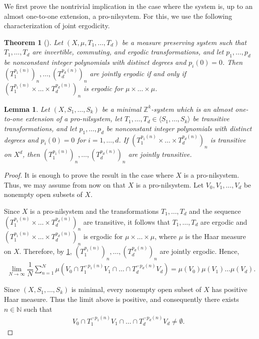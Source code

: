 \documentclass[11pt,reqno]{amsart}
\newcommand{\Z}{\mathbb{Z}}
\newcommand{\N}{\mathbb{N}}
\newtheorem{theorem}{Theorem}[section]
\newtheorem{lemma}[lemma]{Lemma}
\theoremstyle{definition}
\theoremstyle{remark}
\begin{document}
We first prove the nontrivial implication in the case where the system is, up to an almost one-to-one extension, a pro-nilsystem. For this, we use the following characterization of joint ergodicity.

\begin{theorem}[{\cite{Frantzikinakis_Kuca_joint_erg_comm_poly:2025}}]\label{thm: joint_ergodic}
    Let $(X,\mu,T_1,\dots,T_d)$ be a measure preserving system such that $T_1,\dots,T_d$ are invertible, commuting, and ergodic transformations, and let $p_1,\dots,p_d$ be nonconstant integer polynomials with distinct degrees and $p_i(0)=0$. Then $(T_1^{p_1(n)})_{n},\dots,(T_d^{p_d(n)})_{n}$ are jointly ergodic if and only if $(T_1^{p_1(n)}\times \dots\times T_{d}^{p_{d}(n)})_{n}$ is ergodic for $\mu\times\dots\times\mu$.
\end{theorem}

\begin{lemma}\label{lemma: nil_case}
    Let $(X,S_1,\dots,S_k)$ be a minimal $\Z^k$-system which is an almost one-to-one extension of a pro-nilsystem, let $T_1,\dots,T_d\in\langle S_1,\dots,S_k \rangle$ be transitive transformations, and let $p_1,\dots,p_d$ be nonconstant integer polynomials with distinct degrees and $p_i(0)=0$ for $i=1,\dots,d$.  If $(T_1^{p_1(n)}\times \dots\times T_{d}^{p_{d}(n)})_{n}$ is transitive on $X^d$, then $(T_1^{p_1(n)})_{n},\dots,(T_d^{p_d(n)})_{n}$ are jointly transitive.
\end{lemma}

\begin{proof}
    It is enough to prove the result in the case where $X$ is a pro-nilsystem. Thus, we may assume from now on that $X$ is a pro-nilsystem. Let $V_0,V_1,\dots,V_d$ be nonempty open subsets of $X$.

    Since $X$ is a pro-nilsystem and the transformations $T_1,\dots,T_d$ and the sequence $(T_1^{p_1(n)}\times \dots\times T_{d}^{p_{d}(n)})_{n}$ are transitive, it follows that $T_1,\dots,T_d$ are ergodic and $(T_1^{p_1(n)}\times \dots\times T_{d}^{p_{d}(n)})_{n}$ is ergodic for $\mu\times\dots\times\mu$, where $\mu$ is the Haar measure on $X$. Therefore, by \cref{thm: joint_ergodic}, $(T_1^{p_1(n)})_{n},\dots,(T_d^{p_d(n)})_{n}$ are jointly ergodic. Hence,\begin{align*}
        \lim_{N\to\infty}\dfrac{1}{N}\sum_{n=1}^{N} \mu(V_0 \cap T_{1}^{-p_{1}(n)}V_1 \cap\dots\cap T_{d}^{-p_d(n)}V_d) = \mu(V_0)\mu(V_1)\dots\mu(V_d). 
        \end{align*}

        Since $(X,S_1,\dots,S_k)$ is minimal, every nonempty open subset of $X$ has positive Haar measure. Thus the limit above is positive, and consequently there exists $n\in \N$ such that\begin{align*}
            V_0 \cap T_{1}^{-p_{1}(n)}V_1 \cap\dots\cap T_{d}^{-p_d(n)}V_d\neq \emptyset.
        \end{align*} 
\end{proof}
\end{document}
